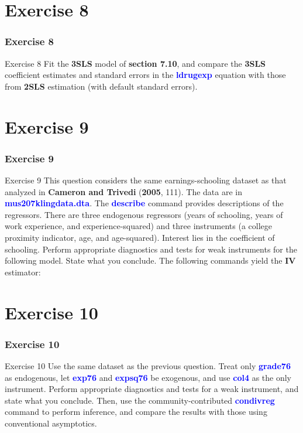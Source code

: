 \documentclass[10pt, aspectratio=169]{beamer}
\begin{document}
	\section{Exercise 8}
		\begin{frame}
			\frametitle{Exercise 8}
			\begin{block}{Exercise 8}
				Fit the \textbf{3SLS} model of \textcolor{red!50}{\textbf{section 7.10}}, and compare the \textbf{3SLS} coefficient estimates
				and standard errors in the \textcolor{blue}{\textbf{ldrugexp}} equation with those from \textbf{2SLS} estimation
				(with default standard errors).
			\end{block}
		\end{frame}
	\section{Exercise 9}
		\begin{frame}[label = slide 1]
			\frametitle{Exercise 9}
			\begin{block}{Exercise 9}
				This question considers the same earnings-schooling dataset as that
				analyzed in \textcolor{green!75}{\textbf{Cameron and Trivedi}} (\textcolor{green!75}{\textbf{2005}}, 111). The data are in
				\textcolor{blue}{\textbf{mus207klingdata.dta}}. The \textcolor{blue}{\textbf{describe}} command provides descriptions of the
				regressors. There are three endogenous regressors (years of schooling, years
				of work experience, and experience-squared) and three instruments (a
				college proximity indicator, age, and age-squared). Interest lies in the
				coefficient of schooling. Perform appropriate diagnostics and tests for weak
				instruments for the following model. State what you conclude. The
				following commands yield the \textbf{IV} estimator:
				\hyperlink{slide 1 - commands}{\beamergotobutton{see commands}}
			\end{block}
		\end{frame}
	\section{Exercise 10}
		\begin{frame}
			\frametitle{Exercise 10}
			\begin{block}{Exercise 10}
				Use the same dataset as the previous question. Treat only \textcolor{blue}{\textbf{grade76}} as
				endogenous, let \textcolor{blue}{\textbf{exp76}} and \textcolor{blue}{\textbf{expsq76}} be exogenous, and use \textcolor{blue}{\textbf{col4}} as the only
				instrument. Perform appropriate diagnostics and tests for a weak instrument,
				and state what you conclude. Then, use the community-contributed
				\textcolor{blue}{\textbf{condivreg}} command to perform inference, and compare the results with
				those using conventional asymptotics.
			\end{block}
		\end{frame}
\end{document}

